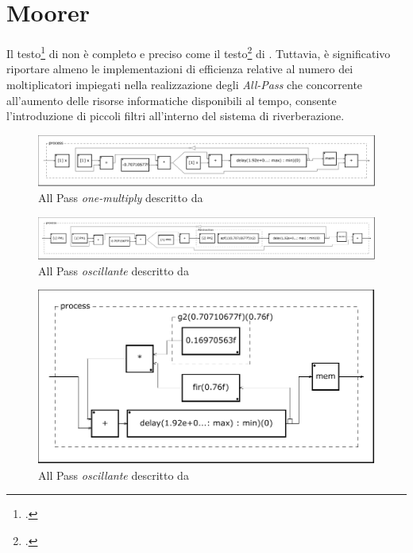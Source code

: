 \section{Moorer}

Il testo\footcite{jm:rev} di \jam non è completo e preciso come il
testo\footcite{ms:rev62} di \ms. Tuttavia, è significativo riportare almeno
le implementazioni di efficienza relative al numero dei moltiplicatori impiegati
nella realizzazione degli \emph{All-Pass} che concorrente all'aumento delle
risorse informatiche disponibili al tempo, consente l'introduzione di piccoli
filtri all'interno del sistema di riverberazione.



\begin{figure}[htp]
\centering
\includegraphics[width=1\textwidth]{Code/amapf-svg/process.pdf}
\caption{All Pass \emph{one-multiply} descritto da \jam}
\label{fig:amapf}
\end{figure}



\begin{figure}[htp]
\centering
\includegraphics[width=1\textwidth]{Code/amapfo-svg/process.pdf}
\caption{All Pass \emph{oscillante} descritto da \jam}
\label{fig:amapfo}
\end{figure}



\begin{figure}[htp]
\centering
\includegraphics[width=1\textwidth]{Code/amcomblp-svg/process.pdf}
\caption{All Pass \emph{oscillante} descritto da \jam}
\label{fig:amcombfir}
\end{figure}
